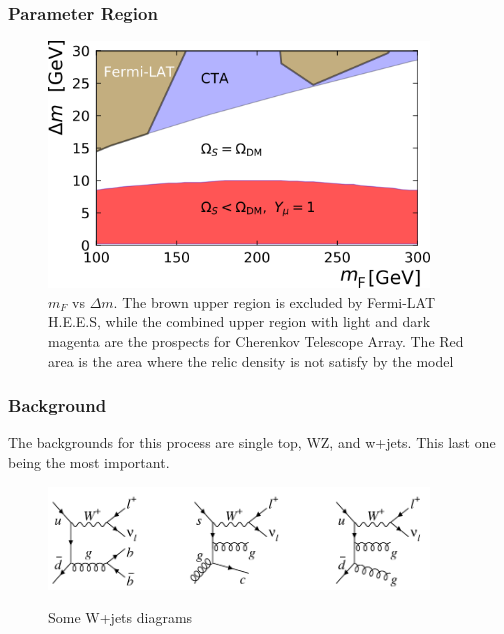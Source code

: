 \documentclass{beamer}
\begin{document}
\begin{frame}
\frametitle{Parameter Region}

\begin{figure}[!tbp]
	\centering
	\includegraphics[width=0.9\textwidth]{pictures/PS}
	\caption{{\scriptsize $m_F$ vs $\Delta m$. The brown upper region is excluded by Fermi-LAT H.E.E.S, while the combined upper region with light and dark magenta are the prospects for Cherenkov Telescope Array. The Red area is the area where the relic density is not satisfy by the model}}
	\label{fig7}
\end{figure}


\end{frame}
\begin{frame}
\frametitle{Background}
The backgrounds for this process are single top, WZ, and w+jets. This last one being the most important.

\begin{figure}[!tbp]
	\centering
	\includegraphics[width=0.9\textwidth]{pictures/WPlusJets}\label{fig8}
	\caption{{\small Some W+jets diagrams}}
	
\end{figure}

\end{frame}
\end{document}
